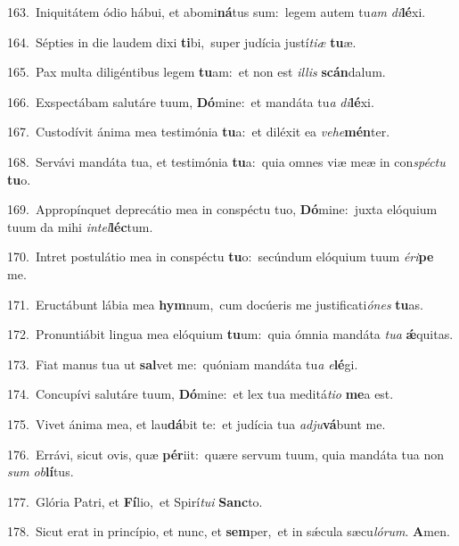 {\numbfont\textcolor{\numbcolor}{163.}}~Iniquitátem ódio hábui, et abomi\-\textbf{ná}\-tus sum:~\star legem autem tu\textit{am} \textit{di}\-\textbf{lé}xi.\par
{\numbfont\textcolor{\numbcolor}{164.}}~Sépties in die laudem dixi \textbf{ti}\-bi,~\star super judícia justí\-\textit{ti}\-\textit{æ} \textbf{tu}\-æ.\par
{\numbfont\textcolor{\numbcolor}{165.}}~Pax multa diligéntibus legem \textbf{tu}\-am:~\star et non est \textit{il}\-\textit{lis} \textbf{scán}\-dalum.\par
{\numbfont\textcolor{\numbcolor}{166.}}~Exspectábam salutáre tuum, \textbf{Dó}\-mine:~\star et mandáta tu\textit{a} \textit{di}\-\textbf{lé}xi.\par
{\numbfont\textcolor{\numbcolor}{167.}}~Custodívit ánima mea testimónia \textbf{tu}\-a:~\star et diléxit ea \textit{ve}\-\textit{he}\textbf{mén}ter.\par
{\numbfont\textcolor{\numbcolor}{168.}}~Servávi mandáta tua, et testimónia \textbf{tu}\-a:~\star quia omnes viæ meæ in con\-\textit{spéc}\-\textit{tu} \textbf{tu}\-o.\par
{\numbfont\textcolor{\numbcolor}{169.}}~Appropínquet deprecátio mea in conspéctu tuo, \textbf{Dó}\-mine:~\star juxta elóquium tuum da mihi \textit{in}\-\textit{tel}\textbf{léc}tum.\par
{\numbfont\textcolor{\numbcolor}{170.}}~Intret postulátio mea in conspéctu \textbf{tu}\-o:~\star secúndum elóquium tuum \textit{é}\-\textit{ri}\textbf{pe} me.\par
{\numbfont\textcolor{\numbcolor}{171.}}~Eructábunt lábia mea \textbf{hym}\-num,~\star cum docúeris me justificati\-\textit{ó}\-\textit{nes} \textbf{tu}\-as.\par
{\numbfont\textcolor{\numbcolor}{172.}}~Pronuntiábit lingua mea elóquium \textbf{tu}\-um:~\star quia ómnia mandáta \textit{tu}\-\textit{a} \textbf{ǽ}\-quitas.\par
{\numbfont\textcolor{\numbcolor}{173.}}~Fiat manus tua ut \textbf{sal}\-vet me:~\star quóniam mandáta tu\textit{a} \textit{e}\-\textbf{lé}gi.\par
{\numbfont\textcolor{\numbcolor}{174.}}~Concupívi salutáre tuum, \textbf{Dó}\-mine:~\star et lex tua meditá\-\textit{ti}\-\textit{o} \textbf{me}\-a est.\par
{\numbfont\textcolor{\numbcolor}{175.}}~Vivet ánima mea, et lau\-\textbf{dá}\-bit te:~\star et judícia tua \textit{ad}\-\textit{ju}\textbf{vá}bunt me.\par
{\numbfont\textcolor{\numbcolor}{176.}}~Errávi, sicut ovis, quæ \textbf{pér}\-iit:~\star quære servum tuum, quia mandáta tua non \textit{sum} \textit{ob}\-\textbf{lí}tus.\par
{\numbfont\textcolor{\numbcolor}{177.}}~Glória Patri, et \textbf{Fí}\-lio,~\star et Spirí\-\textit{tu}\-\textit{i} \textbf{Sanc}\-to.\par
{\numbfont\textcolor{\numbcolor}{178.}}~Sicut erat in princípio, et nunc, et \textbf{sem}\-per,~\star et in sǽcula sæcu\-\textit{ló}\-\textit{rum}. \textbf{A}\-men.\par
